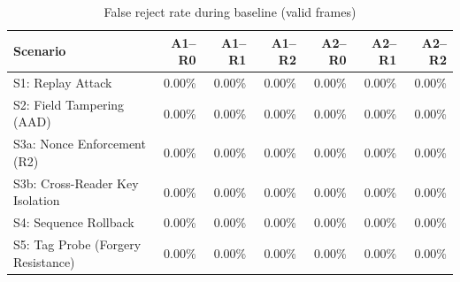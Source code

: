\begin{table}[htbp]
\centering
\caption{False reject rate during baseline (valid frames)}
\label{tab:baseline}
\begin{tabular}{l r r r r r r}
\toprule
Scenario & A1--R0 & A1--R1 & A1--R2 & A2--R0 & A2--R1 & A2--R2 \\
\midrule
  S1: Replay Attack & 0.00\% & 0.00\% & 0.00\% & 0.00\% & 0.00\% & 0.00\% \\
  S2: Field Tampering (AAD) & 0.00\% & 0.00\% & 0.00\% & 0.00\% & 0.00\% & 0.00\% \\
  S3a: Nonce Enforcement (R2) & 0.00\% & 0.00\% & 0.00\% & 0.00\% & 0.00\% & 0.00\% \\
  S3b: Cross-Reader Key Isolation & 0.00\% & 0.00\% & 0.00\% & 0.00\% & 0.00\% & 0.00\% \\
  S4: Sequence Rollback & 0.00\% & 0.00\% & 0.00\% & 0.00\% & 0.00\% & 0.00\% \\
  S5: Tag Probe (Forgery Resistance) & 0.00\% & 0.00\% & 0.00\% & 0.00\% & 0.00\% & 0.00\% \\
\bottomrule
\end{tabular}
\end{table}